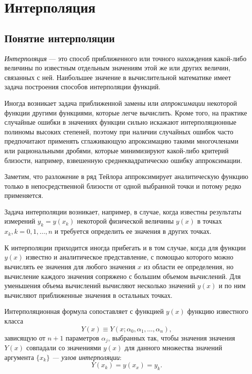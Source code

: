 \section{Интерполяция}


\subsection{Понятие интерполяции}

\emph{Интерполяция} --- это способ приближенного или точного нахождения
какой-либо величины по известным отдельным значениям этой же или других
величин, связанных с ней. Наибольшее значение в вычислительной математике
имеет задача построения способов интерполяции функций.

Иногда возникает задача приближенной замены или \emph{аппроксимации}\emph{
}некоторой функции другими функциями, которые легче вычислить. Кроме
того, на практике случайные ошибки в значениях функции сильно искажают
интерполяционные полиномы высоких степеней, поэтому при наличии случайных
ошибок часто предпочитают применять сглаживающую апроксимацию такими
многочленами или рациональными дробями, которые минимизируют какой-либо
критерий близости, например, взвешенную среднеквадратическю ошибку
аппроксимации.

Заметим, что разложение в ряд Тейлора аппроксимирует аналитическую
функцию только в непосредственной близости от одной выбранной точки
и потому редко применяется.

Задача интерполяции возникает, например, в случае, когда известны
результаты измерений $y_{k}=y(x_{k})$ некоторой физической величины
$y(x)$ в точках $x_{k},k=0,1,\dots,n$ и требуется определить ее
значения в других точках. 

К интерполяции приходится иногда прибегать и в том случае, когда для
функции $y(x)$ известно и аналитическое представление, с помощью
которого можно вычислять ее значения для любого значения $x$ из области
ее определения, но вычисление каждого значения сопряжено с большим
объемом вычислений. Для уменьшения объема вычислений вычисляют несколько
значений $y(x)$ и по ним вычисляют приближенные значения в остальных
точках.

Интерполяционная формула сопоставляет с функцией $y(x)$ функцию известного
класса 
\[
Y(x)\equiv Y(x;\alpha_{0},\alpha_{1},\dots,\alpha_{n}),
\]
зависящую от $n+1$ параметров $\alpha_{j}$, выбранных так, чтобы
значения значения $Y(x)$ совпадали со значениями $y(x)$ для данного
множества значений аргумента $\{x_{k}\}$ \emph{--- узлов интерполяции}:
\[
Y(x_{k})=y(x_{x})=y_{k}.
\]


